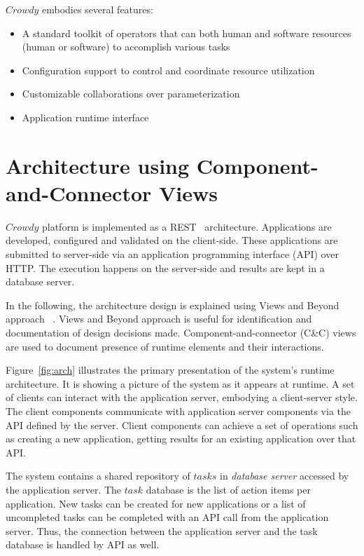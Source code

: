 $Crowdy$ embodies several features:
\begin{itemize}
	\item A standard toolkit of operators that can both human and software resources 
	(human or software) to accomplish various tasks
	\item Configuration support to control and coordinate resource utilization 
	\item Customizable collaborations over parameterization
	\item Application runtime interface
\end{itemize}

\section{Architecture using Component-and-Connector Views}


$Crowdy$ platform is implemented as a REST~\cite{Richardson2008} architecture. 
Applications are developed, configured and validated on the client-side. These 
applications are submitted to server-side via an application programming interface 
(API) over HTTP. The execution happens on the server-side and results are kept 
in a database server.

In the following, the architecture design is explained using Views and Beyond approach
~\cite{Clements}. Views and Beyond approach is useful for identification and documentation of 
design decisions made. Component-and-connector (C\&C) views are used to document 
presence of runtime elements and their interactions.

Figure~\ref{fig:arch} illustrates the primary presentation of the system's 
runtime architecture. It is showing a picture of the system as it appears at runtime. 
A set of clients can interact with the application server, embodying a client-server 
style. The client components communicate with application server components 
via the API defined by the server. Client components can achieve a set of operations 
such as creating a new application, getting results for an existing application over that API.

The system contains a shared repository of $tasks$ in \textit{database server} 
accessed by the application server. The $task$ database is the list of action 
items per application. New tasks can be created for new applications or a 
list of uncompleted tasks can be completed 
with an API call from the application server. Thus, the connection between the 
application server and the task database is handled by API as well.

